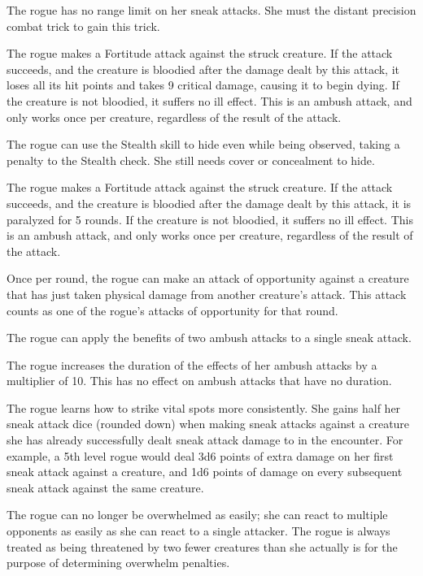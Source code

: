  The rogue has no range limit on her sneak attacks. She must the distant precision combat trick to gain this trick.

 The rogue makes a Fortitude attack against the struck creature. If the attack succeeds, and the creature is bloodied after the damage dealt by this attack, it loses all its hit points and takes 9 critical damage, causing it to begin dying. If the creature is not bloodied, it suffers no ill effect. This is an ambush attack, and only works once per creature, regardless of the result of the attack.

 The rogue can use the Stealth skill to hide even while being observed, taking a  penalty to the Stealth check. She still needs cover or concealment to hide.

 The rogue makes a Fortitude attack against the struck creature. If the attack succeeds, and the creature is bloodied after the damage dealt by this attack, it is paralyzed for 5 rounds. If the creature is not bloodied, it suffers no ill effect. This is an ambush attack, and only works once per creature, regardless of the result of the attack.

 Once per round, the rogue can make an attack of opportunity against a creature that has just taken physical damage from another creature's attack. This attack counts as one of the rogue's attacks of opportunity for that round.

 The rogue can apply the benefits of two ambush attacks to a single sneak attack.

 The rogue increases the duration of the effects of her ambush attacks by a multiplier of 10. This has no effect on ambush attacks that have no duration.

 The rogue learns how to strike vital spots more consistently. She gains half her sneak attack dice (rounded down) when making sneak attacks against a creature she has already successfully dealt sneak attack damage to in the encounter. For example, a 5th level rogue would deal 3d6 points of extra damage on her first sneak attack against a creature, and 1d6 points of damage on every subsequent sneak attack against the same creature.

 The rogue can no longer be overwhelmed as easily; she can react to multiple opponents as easily as she can react to a single attacker. The rogue is always treated as being threatened by two fewer creatures than she actually is for the purpose of determining overwhelm penalties. 

